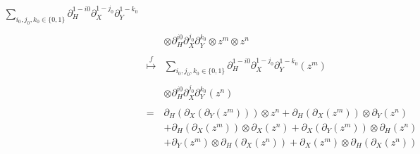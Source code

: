 \documentclass[10pt,a4paper]{article}
\begin{document}
\begin{description}
$$\begin{array}{rcl}
\sum_{i_0, j_0, k_0 \in \{0,1\}}%
\partial_H^{1 - i0} \partial_X^{1 - j_0} \partial_Y^{1 - k_0} \\
&&\\&&\otimes \partial_H^{i0} \partial_X^{j_0} \partial_Y^{k_0} \otimes z^m \otimes z^n\\
&&\\
&\stackrel{f}{\longmapsto}& \sum_{i_0, j_0, k_0 \in \{0,1\}}%
\partial_H^{1 - i0} \partial_X^{1 - j_0} \partial_Y^{1 - k_0}(z^m) \\
&&\\&&\otimes \partial_H^{i0} \partial_X^{j_0} \partial_Y^{k_0}(z^n)\\
&&\\
&=& \partial_H(\partial_X(\partial_Y(z^m))) \otimes z^n + \partial_H(\partial_X(z^m)) \otimes \partial_Y(z^n)\\
&& + \partial_H(\partial_X(z^m)) \otimes \partial_X(z^n) + \partial_X(\partial_Y(z^m)) \otimes \partial_H(z^n)\\
&& + \partial_Y(z^m) \otimes \partial_H(\partial_X(z^n)) + \partial_X(z^m) \otimes \partial_H(\partial_X(z^n)) \\

\end{array}$$
\end{description}
\end{document}
